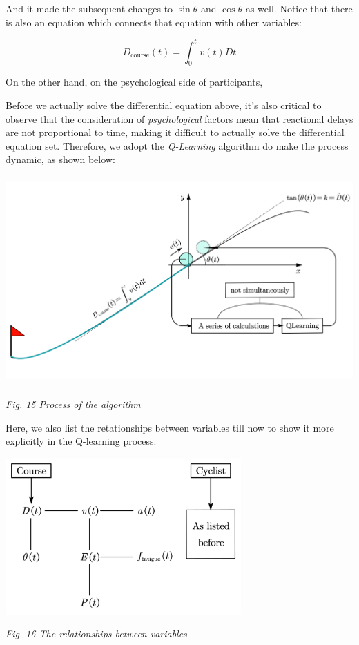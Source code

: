 \documentclass{article}
\begin{document}
			And it made the subsequent changes to \( \sin\theta \) and \(\cos \theta\) as well. Notice that there is also an equation which connects that equation with other variables:

			\[ D_{\mathrm{course}}\left( t \right) =\int_0^t{v\left( t \right)  D t} \]

			On the other hand, on the psychological side of participants,

			Before we actually solve the differential equation above, it's also critical to observe that the consideration of \textit{psychological} factors mean that reactional delays are not proportional to time, making it difficult to actually solve the differential equation set. Therefore, we adopt the \textit{Q-Learning} algorithm do make the process dynamic, as shown below:

			\begin{center}
				\includegraphics[height=8cm]{Recalculating speed function.png}

				\small\textit{Fig. 15 Process of the algorithm}
			\end{center}

			Here, we also list the retationships between variables till now to show it more explicitly in the Q-learning process:\

			\begin{center}
				\includegraphics[height = 6cm]{the relationship between variables.png}

				\small\textit{Fig. 16 The relationships between variables}
			\end{center}
\end{document}
